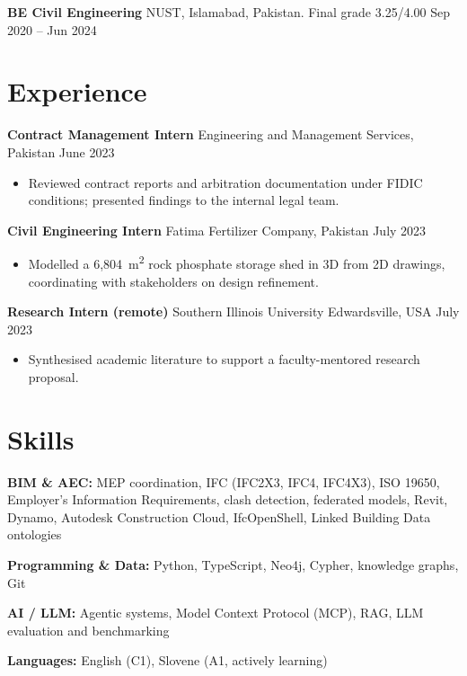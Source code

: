 \documentclass[a4paper,10.5pt]{article}
\newcommand{\datefill}{\dotfill}
\newcommand{\entry}[3]{\vspace{2.5pt}\noindent\textbf{#1} \textbar{} #2 \datefill{} #3\par\vspace{0.5pt}}
\newcommand{\skillrow}[2]{\noindent\textbf{#1:} #2\par\vspace{1pt}}
\begin{document}
\entry{BE Civil Engineering}{NUST, Islamabad, Pakistan. Final grade 3.25/4.00}{Sep 2020 -- Jun 2024}

\section{Experience}
\entry{Contract Management Intern}{Engineering and Management Services, Pakistan}{June 2023}
\begin{itemize}
  \item Reviewed contract reports and arbitration documentation under FIDIC
        conditions; presented findings to the internal legal team.
\end{itemize}

\entry{Civil Engineering Intern}{Fatima Fertilizer Company, Pakistan}{July 2023}
\begin{itemize}
  \item Modelled a 6,804~m\textsuperscript{2} rock phosphate storage shed in 3D from
        2D drawings, coordinating with stakeholders on design refinement.
\end{itemize}

\entry{Research Intern (remote)}{Southern Illinois University Edwardsville, USA}{July 2023}
\begin{itemize}
  \item Synthesised academic literature to support a faculty-mentored research proposal.
\end{itemize}

\section{Skills}

\skillrow{BIM \& AEC}{MEP coordination, IFC (IFC2X3, IFC4, IFC4X3), ISO 19650, Employer's Information Requirements, clash detection, federated models, Revit, Dynamo, Autodesk Construction Cloud, IfcOpenShell, Linked Building Data ontologies}
\skillrow{Programming \& Data}{Python, TypeScript, Neo4j, Cypher, knowledge graphs, Git}
\skillrow{AI / LLM}{Agentic systems, Model Context Protocol (MCP), RAG, LLM evaluation and benchmarking}

\skillrow{Languages}{English (C1), Slovene (A1, actively learning)}
\end{document}
